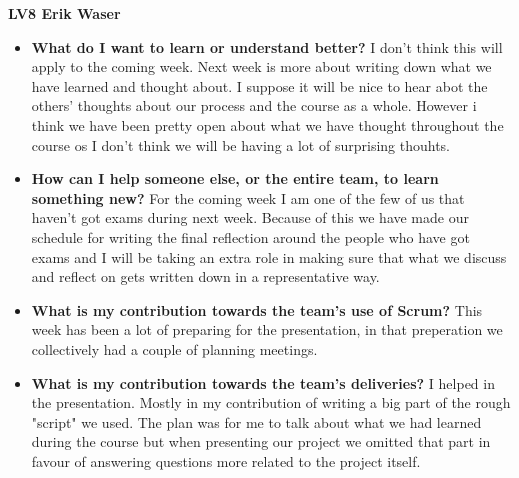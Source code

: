 \documentclass[]{article}
\begin{document}
\textbf{\huge{LV8} Erik Waser}

\begin{itemize}
    \item \textbf{What do I want to learn or understand better?} \newline
    I don't think this will apply to the coming week. Next week is more about writing down what we have learned and thought about. I suppose it will be nice to hear abot the others' thoughts about our process and the course as a whole. However i think we have been pretty open about what we have thought throughout the course os I don't think we will be having a lot of surprising thouhts. 
    
    \item \textbf{How can I help someone else, or the entire team, to learn something new?} \newline
    For the coming week I am one of the few of us that haven't got exams during next week. Because of this we have made our schedule for writing the final reflection around the people who have got exams and I will be taking an extra role in making sure that what we discuss and reflect on gets written down in a representative way. 
    
    
    \item \textbf{What is my contribution towards the team’s use of Scrum?} \newline
    This week has been a lot of preparing for the presentation, in that preperation we collectively had a couple of planning meetings. 
    
    

    
    \item \textbf{What is my contribution towards the team’s deliveries?} \newline
    I helped in the presentation. Mostly in my contribution of writing a big part of the rough "script" we used. The plan was for me to talk about what we had learned during the course but when presenting our project we omitted that part in favour of answering questions more related to the project itself. 
    
    
    
\end{itemize}
\end{document}
